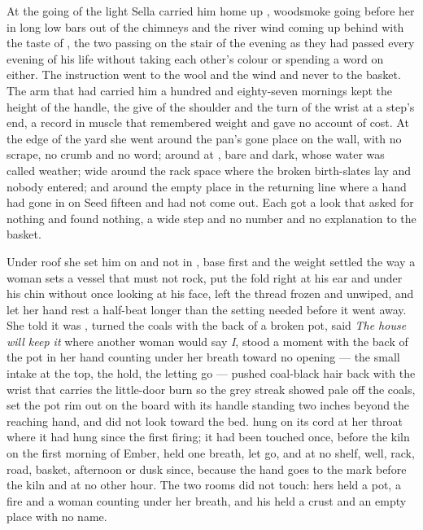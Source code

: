 At the going of the light Sella carried him home up , woodsmoke going before her in long low bars out of the chimneys and the river wind coming up behind with the taste of , the two passing on the stair of the evening as they had passed every evening of his life without taking each other's colour or spending a word on either. The instruction went to the wool and the wind and never to the basket. The arm that had carried him a hundred and eighty-seven mornings kept the height of the handle, the give of the shoulder and the turn of the wrist at a step's end, a record in muscle that remembered weight and gave no account of cost. At the edge of the yard she went around the pan's gone place on the wall, with no scrape, no crumb and no word; around  at , bare and dark, whose water was called weather; wide around the rack space where the broken birth-slates lay and nobody entered; and around the empty place in the returning line where a hand had gone in on Seed fifteen and had not come out. Each got a look that asked for nothing and found nothing, a wide step and no number and no explanation to the basket.

Under  roof she set him on  and not in , base first and the weight settled the way a woman sets a vessel that must not rock, put the fold right at his ear and under his chin without once looking at his face, left the thread frozen and unwiped, and let her hand rest a half-beat longer than the setting needed before it went away. She told  it was , turned the coals with the back of a broken pot, said \emph{The house will keep it} where another woman would say \emph{I}, stood a moment with the back of the pot in her hand counting under her breath toward no opening --- the small intake at the top, the hold, the letting go --- pushed coal-black hair back with the wrist that carries the little-door burn so the grey streak showed pale off the coals, set the pot rim out on the board with its handle standing two inches beyond the reaching hand, and did not look toward the bed.  hung on its cord at her throat where it had hung since the first firing; it had been touched once, before the kiln on the first morning of Ember, held one breath, let go, and at no shelf, well, rack, road, basket, afternoon or dusk since, because the hand goes to the mark before the kiln and at no other hour. The two rooms did not touch: hers held a pot, a fire and a woman counting under her breath, and his held a crust and an empty place with no name.

